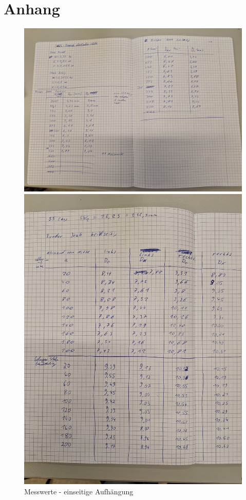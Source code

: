 \section{Anhang}
\label{sec:Anhang}
\begin{figure}[h]
    \centering
    \begin{minipage}{0.5\textwidth}
        \centering
        \includegraphics[width=\textwidth]{Bilder/Daten1.jpg}
        \caption{Messwerte - einseitige Aufhängung}
    \end{minipage}
    \hfill
    \centering
    \begin{minipage}{0.5\textwidth}
        \centering
        \includegraphics[width=\textwidth]{Bilder/Daten2.jpg}

\end{minipage}
\end{figure}
